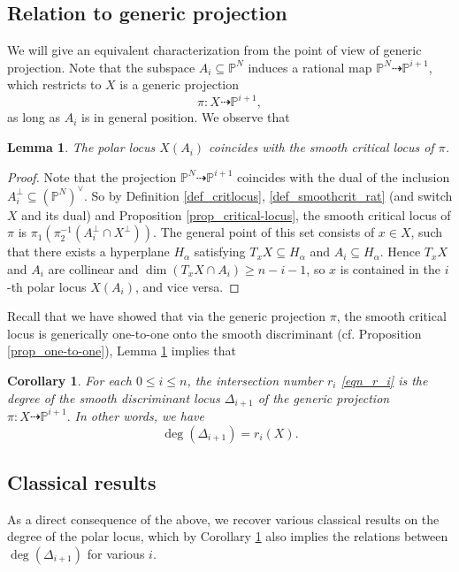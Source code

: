 \documentclass[12pt]{amsart}
\newtheorem{corollary}[theorem]{Corollary}
\newtheorem{lemma}[theorem]{Lemma}
\begin{document}
\subsection{Relation to generic projection}
We will give an equivalent characterization from the point of view of generic projection. Note that the subspace $A_i\subseteq \mathbb P^{N}$ induces a rational map $\mathbb P^N\dashrightarrow \mathbb P^{i+1}$, which restricts to $X$ is a generic projection
$$\pi: X\dashrightarrow \mathbb P^{i+1},$$
as long as $A_i$ is in general position. We observe that


\begin{lemma}\label{lemma_polar=crit}
The polar locus $X(A_i)$ coincides with the smooth critical locus of $\pi$.    
\end{lemma}
\begin{proof}
    Note that the projection $\mathbb P^N\dashrightarrow \mathbb P^{i+1}$ coincides with the dual of the inclusion $A_i^{\perp }\subseteq (\mathbb P^N)^{\vee}$. So by
    Definition \ref{def_critlocus}, \ref{def_smoothcrit_rat} (and switch $X$ and its dual) and Proposition \ref{prop_critical-locus}, the smooth critical locus of $\pi$ is $\pi_1(\pi_2^{-1}(A_i^{\perp}\cap X^{\perp}))$. The general point of this set consists of $x\in X$, such that there exists a hyperplane $H_{\alpha}$ satisfying $T_xX\subseteq H_{\alpha}$ and $A_i\subseteq H_{\alpha}$. Hence $T_xX$ and $A_i$ are collinear and $\dim (T_xX\cap A_i)\ge n-i-1$, so $x$ is contained in the $i$-th polar locus $X(A_i)$, and vice versa.
\end{proof}

Recall that we have showed that via the generic projection $\pi$, the smooth critical locus is generically one-to-one onto the smooth discriminant (cf. Proposition \ref{prop_one-to-one}), Lemma \ref{lemma_polar=crit} implies that
\begin{corollary}\label{cor_r_i=deg(disc)}
  For each $0\le i\le n$, the intersection number $r_i$ \eqref{eqn_r_i} is the degree of the smooth discriminant locus $\Delta_{i+1}$ of the generic projection $\pi: X\dashrightarrow \mathbb P^{i+1}.$ In other words, we have
$$\deg(\Delta_{i+1})=r_i(X).$$
\end{corollary}



\subsection{Classical results}
As a direct consequence of the above, we recover various classical results on the degree of the polar locus, which by Corollary \ref{cor_r_i=deg(disc)} also implies the relations between $\deg(\Delta_{i+1})$ for various $i$.
\end{document}
